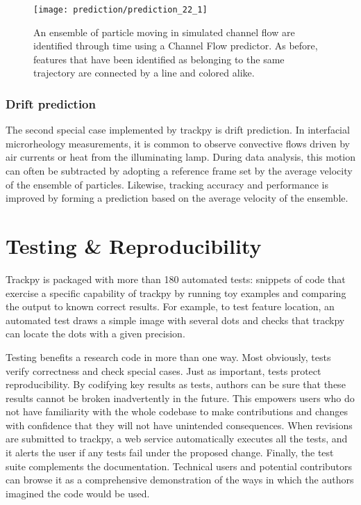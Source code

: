    \begin{figure}
    \centering
    \texttt{[image: prediction/prediction\_22\_1]}
    \caption{\label{fig:prediction-channel-channel-link}An ensemble of particle moving in simulated channel flow are identified through time using a Channel Flow predictor. As before, features that have been identified as belonging to the same trajectory are connected by a line and colored alike. }
    \end{figure}

    \subsubsection{Drift prediction}\label{drift-prediction}
    
The second special case implemented by trackpy is drift prediction. In interfacial microrheology measurements, it is common to observe convective flows driven by air currents or heat from the illuminating lamp. During data analysis, this motion can often be subtracted by adopting a reference frame set by the average velocity of the ensemble of particles. Likewise, tracking accuracy and performance is improved by forming a prediction based on the average velocity of the ensemble.

\section{\label{sec:testing}Testing \& Reproducibility}

Trackpy is packaged with more than 180 automated tests: snippets of code that exercise a specific capability of trackpy by running toy examples and comparing the output to known correct results. For example, to test feature location, an automated test draws a simple image with several dots and checks that trackpy can locate the dots with a given precision.

Testing benefits a research code in more than one way. Most obviously, tests verify correctness and check special cases. Just as important, tests protect reproducibility. By codifying key results as tests, authors can be sure that these results cannot be broken inadvertently in the future. This empowers users who do not have familiarity with the whole codebase to make contributions and changes with confidence that they will not have unintended consequences. When revisions are submitted to trackpy, a web service automatically executes all the tests, and it alerts the user if any tests fail under the proposed change. Finally, the test suite complements the documentation. Technical users and potential contributors can browse it as a comprehensive demonstration of the ways in which the authors imagined the code would be used.

